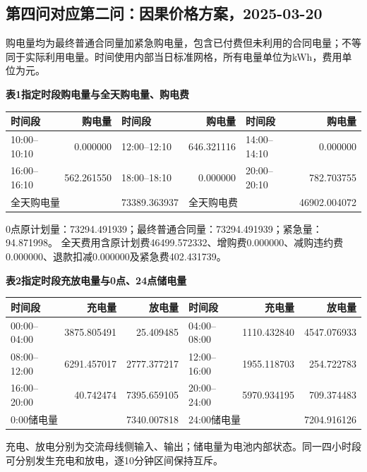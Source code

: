 \subsection{第四问对应第二问：因果价格方案，2025-03-20}
\begingroup\small
\setlength{\tabcolsep}{4pt}\renewcommand{\arraystretch}{1.08}
\setlength{\LTpre}{4pt}\setlength{\LTpost}{4pt}
\noindent 购电量均为最终普通合同量加紧急购电量，包含已付费但未利用的合同电量；不等同于实际利用电量。时间使用内部当日标准网格，所有电量单位为kWh，费用单位为元。
\begin{center}\textbf{表1\quad 指定时段购电量与全天购电量、购电费}\par\smallskip
\begin{tabular}{lr lr lr}\toprule
时间段 & 购电量 & 时间段 & 购电量 & 时间段 & 购电量\\\midrule
10:00--10:10 & 0.000000 & 12:00--12:10 & 646.321116 & 14:00--14:10 & 0.000000\\
16:00--16:10 & 562.261550 & 18:00--18:10 & 0.000000 & 20:00--20:10 & 782.703755\\
\midrule
\multicolumn{2}{l}{全天购电量} & 73389.363937 & \multicolumn{2}{l}{全天购电费} & 46902.004072\\
\bottomrule\end{tabular}\end{center}
\noindent 0点原计划量：73294.491939；最终普通合同量：73294.491939；紧急量：94.871998。
全天费用含原计划费46499.572332、增购费0.000000、减购违约费0.000000、退款扣减0.000000及紧急费402.431739。
\begin{center}\textbf{表2\quad 指定时段充放电量与0点、24点储电量}\par\smallskip
\begin{tabular}{lrr lrr}\toprule
时间段 & 充电量 & 放电量 & 时间段 & 充电量 & 放电量\\\midrule
00:00--04:00 & 3875.805491 & 25.409485 & 04:00--08:00 & 1110.432840 & 4547.076933\\
08:00--12:00 & 6291.457017 & 2777.377217 & 12:00--16:00 & 1955.118703 & 254.722783\\
16:00--20:00 & 40.742474 & 7395.659105 & 20:00--24:00 & 5970.934195 & 709.374483\\
\midrule
\multicolumn{2}{l}{0:00储电量} & 7340.007818 & \multicolumn{2}{l}{24:00储电量} & 7204.916126\\
\bottomrule\end{tabular}\end{center}
\noindent 充电、放电分别为交流母线侧输入、输出；储电量为电池内部状态。同一四小时段可分别发生充电和放电，逐10分钟区间保持互斥。
